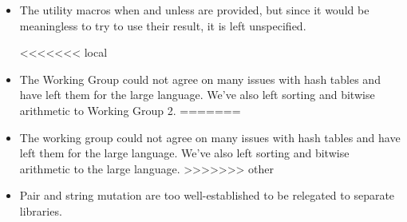 \begin{itemize}
\item The utility macros {\cf when} and {\cf unless} are provided, but since it would be
meaningless to try to use their result, it is left unspecified.

<<<<<<< local
\item The Working Group could not agree on many issues with hash tables and have left them for
the large language. We've also left sorting and bitwise arithmetic to Working Group 2.
=======
\item The working group could not agree on many issues with hash tables and have left them for
the large language.  We've also left sorting and bitwise arithmetic to
the large language.
>>>>>>> other

\item Pair and string mutation are too well-established to be relegated to
separate libraries.

\end{itemize}

